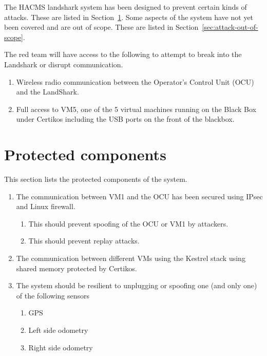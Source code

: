 
The HACMS landshark system has been designed to prevent certain kinds of attacks. These are
listed in Section~\ref{sec:attack-protected}.  Some aspects of the system have not yet been
covered and are out of scope.
These are listed in Section~\ref{sec:attack-out-of-scope}. 

The red team will have access to the following to attempt to break into the Landshark or disrupt
communication.
\begin{enumerate}
  \item	Wireless radio communication between the Operator’s Control Unit (OCU) and the
    LandShark.
  \item	Full access to VM5, one of the 5 virtual machines running on the Black Box under
    Certikos including the USB ports on the front of the blackbox.
\end{enumerate}

\section{Protected components}
\label{sec:attack-protected}
This section lists the protected components of the system. 
\begin{enumerate}
  \item The communication between VM1 and the OCU has been secured using IPsec and Linux
    firewall.
    \begin{enumerate}
      \item This should prevent spoofing of the OCU or VM1 by attackers.
      \item This should prevent replay attacks.
    \end{enumerate}
  \item The communication between different VMs using the Kestrel stack using shared memory
    protected by Certikos.
  \item The system should be resilient to unplugging or spoofing one (and only one) of the following sensors
    \begin{enumerate}
      \item GPS
      \item Left side odometry
      \item Right side odometry
    \end{enumerate}
\end{enumerate}



